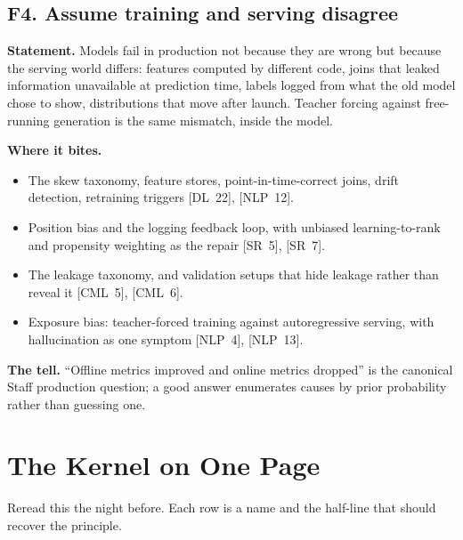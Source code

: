 \subsection*{F4. Assume training and serving disagree}

\textbf{Statement.} Models fail in production not because they are wrong but because the serving world differs: features computed by different code, joins that leaked information unavailable at prediction time, labels logged from what the old model chose to show, distributions that move after launch. Teacher forcing against free-running generation is the same mismatch, inside the model.

\textbf{Where it bites.}
\begin{itemize}[itemsep=1pt,topsep=2pt,leftmargin=1.3em]
\item The skew taxonomy, feature stores, point-in-time-correct joins, drift detection, retraining triggers [DL~22], [NLP~12].
\item Position bias and the logging feedback loop, with unbiased learning-to-rank and propensity weighting as the repair [SR~5], [SR~7].
\item The leakage taxonomy, and validation setups that hide leakage rather than reveal it [CML~5], [CML~6].
\item Exposure bias: teacher-forced training against autoregressive serving, with hallucination as one symptom [NLP~4], [NLP~13].
\end{itemize}

\textbf{The tell.} ``Offline metrics improved and online metrics dropped'' is the canonical Staff production question; a good answer enumerates causes by prior probability rather than guessing one.

\section*{The Kernel on One Page}

Reread this the night before. Each row is a name and the half-line that should recover the principle.

